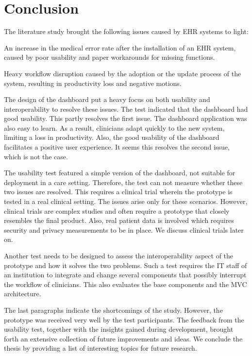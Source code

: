 \section{Conclusion}

The literature study brought the following issues caused by EHR systems to light:
\begin{myitemize}
    \item An increase in the medical error rate after the installation of an EHR system, caused by poor usability and paper workarounds for missing functions.
    \item Heavy workflow disruption caused by the adoption or the update process of the system, resulting in productivity loss and negative motions.
\end{myitemize}

\noindent The design of the dashboard put a heavy focus on both usability and interoperability to resolve these issues. The test indicated that the dashboard had good usability. This partly resolves the first issue. The dashboard application was also easy to learn. As a result, clinicians adapt quickly to the new system, limiting a loss in productivity. Also, the good usability of the dashboard facilitates a positive user experience. It seems this resolves the second issue, which is not the case.

The usability test featured a simple version of the dashboard, not suitable for deployment in a care setting. Therefore, the test can not measure whether these two issues are resolved. This requires a clinical trial wherein the prototype is tested in a real clinical setting. The issues arise only for these scenarios. However, clinical trials are complex studies and often require a prototype that closely resembles the final product. Also, real patient data is involved which requires security and privacy measurements to be in place. We discuss clinical trials later on.

Another test needs to be designed to assess the interoperability aspect of the prototype and how it solves the two problems. Such a test requires the IT staff of an institution to integrate and change several components that possibly interrupt the workflow of clinicians. This also evaluates the base components and the MVC architecture.

The last paragraphs indicate the shortcomings of the study. However, the prototype was received very well by the test participants. The feedback from the usability test, together with the insights gained during development, brought forth an extensive collection of future improvements and ideas. We conclude the thesis by providing a list of interesting topics for future research.

